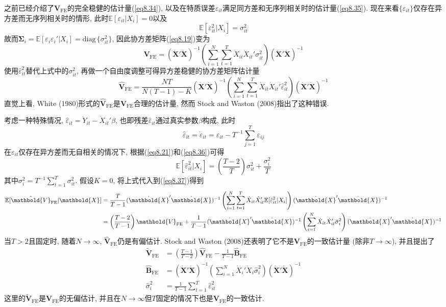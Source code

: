 \documentclass[cn, 12pt, math=mtpro2, bibstyle=apa, blue, twocol]{elegantbook}
\newcommand{\E}{\mathbb{E}}
\newcommand{\X}{\mathbold{X}}
\newcommand{\V}{\mathbold{V}}
\newcommand{\overbar}[1]{\mkern 1.5mu\overline{\mkern-1.5mu#1\mkern-1.5mu}\mkern 1.5mu}
\begin{document}
之前已经介绍了$\V_{\text{FE}}$的完全稳健的估计量(\ref{eq8.34}), 以及在特质误差$\varepsilon_{it}$满足同方差和无序列相关时的估计量(\ref{eq8.35}). 现在来看$\{\varepsilon_{it}\}$仅存在异方差而无序列相关时的情形, 此时$\E[\varepsilon_{it}|X_i]=0$以及
\begin{equation}\label{eq8.36}
  \E[\varepsilon_{it}^2|X_i]=\sigma_{it}^2
\end{equation}
故而$\mathbold{\Sigma}_i=\E[\varepsilon_i\varepsilon_i'|X_i]=\text{diag}\,\{\sigma_{it}^2\}$, 因此协方差矩阵(\ref{eq8.19})变为
$$\V_{\text{FE}}=(\dot{\X}'\dot{\X})^{-1}\left(\sum_{i=1}^{N}\sum_{t=1}^{T}\dot{X}_{it}\dot{X}_{it}'\sigma_{it}^2\right)(\dot{\X}'\dot{\X})^{-1}$$
使用$\hat{\varepsilon}_{it}^2$替代上式中的$\sigma_{it}^2$, 再做一个自由度调整可得异方差稳健的协方差矩阵估计量
\begin{equation}\label{eq8.37}
  \hat{\V}_{\text{FE}}=\frac{NT}{N(T-1)-K}(\dot{\X}'\dot{\X})^{-1}\left(\sum_{i=1}^{N}\sum_{t=1}^{T}\dot{X}_{it}\dot{X}_{it}'\hat{\varepsilon}_{it}^2\right)(\dot{\X}'\dot{\X})^{-1}
\end{equation}
直觉上看, White (1980)形式的$\hat{\V}_{\text{FE}}$是$\V_{\text{FE}}$合理的估计量, 然而 Stock and Waston (2008)指出了这种错误.

考虑一种特殊情况, $\hat{\varepsilon}_{it}=\dot{Y}_{it}-\dot{X}_{it}'\beta$, 也即残差$\hat{\varepsilon}_{it}$通过真实参数$\beta$构成, 此时
$$\hat{\varepsilon}_{it}=\dot{\varepsilon}_{it}=\varepsilon_{it}-T^{-1}\sum_{j=1}^{T}\varepsilon_{ij}$$
在$\varepsilon_{it}$仅存在异方差而无自相关的情况下, 根据(\ref{eq8.21})和(\ref{eq8.36})可得
$$\E[\hat{\varepsilon}_{it}^2|X_i]=\left(\frac{T-2}{T}\right)\sigma_{it}^2+\frac{\sigma_i^2}{T}$$
其中$\sigma_i^2=T^{-1}\sum_{t=1}^{T}\sigma_{it}^2$. 假设$K=0$, 将上式代入到(\ref{eq8.37})得到
\begin{align*}
\E[\hat{\V}_{\text{FE}}|\X]&=\frac{T}{T-1}(\dot{\X}'\dot{\X})^{-1}\left(\sum_{i=1}^{N}\sum_{t=1}^{T}\dot{X}_{it}\dot{X}_{it}'\E[\hat{\varepsilon}_{it}^2|X_i]\right)(\dot{\X}'\dot{\X})^{-1} \\
&=\left(\frac{T-2}{T-1}\right)\V_{\text{FE}}+\frac{1}{T-1}(\dot{\X}'\dot{\X})^{-1}\left(\sum_{i=1}^{N}\dot{X}_{it}\dot{X}_{it}'\overbar{\sigma}_i^2\right)(\dot{\X}'\dot{\X})^{-1}
\end{align*}
当$T>2$且固定时, 随着$N\to\infty$, $\hat{\V}_{\text{FE}}$仍是有偏估计. Stock and Waston (2008)还表明了它不是$\V_{\text{FE}}$的一致估计量 (除非$T\to\infty$),  并且提出了
\begin{align*}
\tilde{\V}_{\text{FE}}&=\left(\frac{T-1}{T-2}\right)\hat{\V}_{\text{FE}}-\frac{1}{T-1}\hat{\mathbold{B}}_{\text{FE}} \\
\hat{\mathbold{B}}_{\text{FE}}&=(\dot{\X}'\dot{\X})^{-1}\left(\sum_{i=1}^{N}\dot{X}_i'\dot{X}_i\hat{\sigma}_i^2\right)(\dot{\X}'\dot{\X})^{-1} \\
\hat{\sigma}_i^2&=\frac{1}{T-1}\sum_{t=1}^{T}\hat{\varepsilon}_{it}^2
\end{align*}
这里的$\tilde{\V}_{\text{FE}}$是$\V_{\text{FE}}$的无偏估计, 并且在$N\to\infty$但$T$固定的情况下也是$\V_{\text{FE}}$的一致估计.
\end{document}
